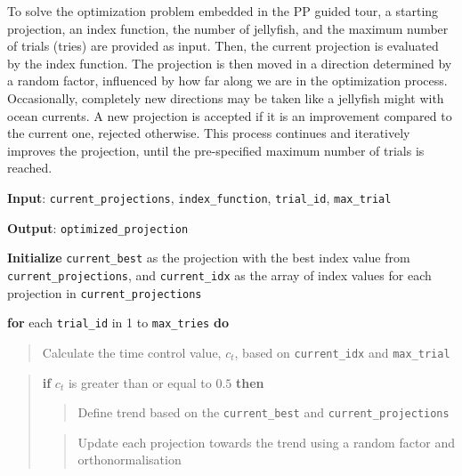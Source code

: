 \documentclass[
  12pt,
]{interact}
\theoremstyle{plain}
\begin{document}
To solve the optimization problem embedded in the PP guided tour, a
starting projection, an index function, the number of jellyfish, and the
maximum number of trials (tries) are provided as input. Then, the
current projection is evaluated by the index function. The projection is
then moved in a direction determined by a random factor, influenced by
how far along we are in the optimization process. Occasionally,
completely new directions may be taken like a jellyfish might with ocean
currents. A new projection is accepted if it is an improvement compared
to the current one, rejected otherwise. This process continues and
iteratively improves the projection, until the pre-specified maximum
number of trials is reached.

\begin{tcolorbox}[enhanced jigsaw, toptitle=1mm, rightrule=.15mm, opacitybacktitle=0.6, left=2mm, leftrule=.75mm, opacityback=0, arc=.35mm, colbacktitle=quarto-callout-note-color!10!white, colback=white, coltitle=black, titlerule=0mm, bottomrule=.15mm, bottomtitle=1mm, toprule=.15mm, breakable, colframe=quarto-callout-note-color-frame, title={Algorithm: Jellyfish Optimizer Pseudo Code}]

\textbf{Input}: \texttt{current\_projections}, \texttt{index\_function},
\texttt{trial\_id}, \texttt{max\_trial}

\textbf{Output}: \texttt{optimized\_projection}

\textbf{Initialize} \texttt{current\_best} as the projection with the
best index value from \texttt{current\_projections}, and
\texttt{current\_idx} as the array of index values for each projection
in \texttt{current\_projections}

\textbf{for} each \texttt{trial\_id} in 1 to \texttt{max\_tries}
\textbf{do}

\begin{quote}
Calculate the time control value, \(c_t\), based on
\texttt{current\_idx} and \texttt{max\_trial}
\end{quote}

\begin{quote}
\textbf{if} \(c_t\) is greater than or equal to \(0.5\) \textbf{then}

\begin{quote}
Define trend based on the \texttt{current\_best} and
\texttt{current\_projections}
\end{quote}

\begin{quote}
Update each projection towards the trend using a random factor and
orthonormalisation
\end{quote}


\end{quote}
\end{tcolorbox}
\end{document}
